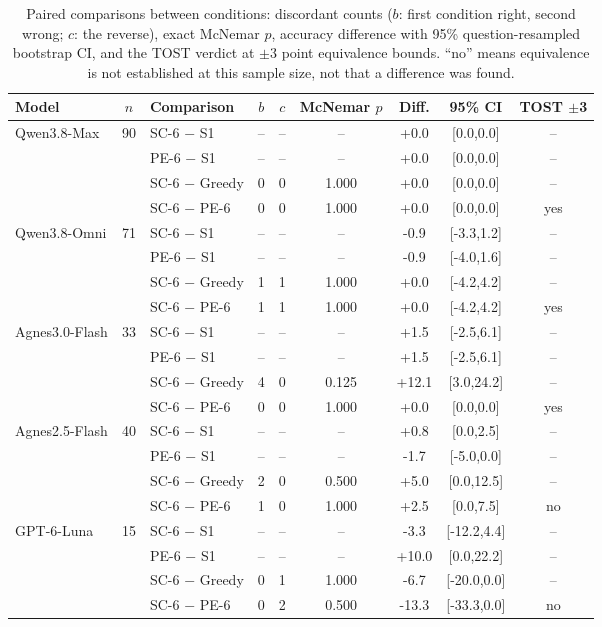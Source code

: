 \documentclass[preprint,12pt]{elsarticle}
\begin{document}
\begin{table}[htbp]
\centering
\footnotesize
\caption{Paired comparisons between conditions: discordant counts ($b$: first condition right, second wrong; $c$: the reverse), exact McNemar $p$, accuracy difference with 95\% question-resampled bootstrap CI, and the TOST verdict at $\pm 3$ point equivalence bounds. ``no'' means equivalence is not established at this sample size, not that a difference was found.}

\scriptsize
\begin{tabular}{l c l c c c c c c}
\toprule
Model & $n$ & Comparison & $b$ & $c$ & McNemar $p$ & Diff. & 95\% CI & TOST $\pm$3 \\
\midrule
Qwen3.8-Max & 90 & SC-6 $-$ S1 & -- & -- & -- & +0.0 & [0.0,0.0] & -- \\
 &  & PE-6 $-$ S1 & -- & -- & -- & +0.0 & [0.0,0.0] & -- \\
 &  & SC-6 $-$ Greedy & 0 & 0 & 1.000 & +0.0 & [0.0,0.0] & -- \\
 &  & SC-6 $-$ PE-6 & 0 & 0 & 1.000 & +0.0 & [0.0,0.0] & yes \\

Qwen3.8-Omni & 71 & SC-6 $-$ S1 & -- & -- & -- & -0.9 & [-3.3,1.2] & -- \\
 &  & PE-6 $-$ S1 & -- & -- & -- & -0.9 & [-4.0,1.6] & -- \\
 &  & SC-6 $-$ Greedy & 1 & 1 & 1.000 & +0.0 & [-4.2,4.2] & -- \\
 &  & SC-6 $-$ PE-6 & 1 & 1 & 1.000 & +0.0 & [-4.2,4.2] & yes \\

Agnes3.0-Flash & 33 & SC-6 $-$ S1 & -- & -- & -- & +1.5 & [-2.5,6.1] & -- \\
 &  & PE-6 $-$ S1 & -- & -- & -- & +1.5 & [-2.5,6.1] & -- \\
 &  & SC-6 $-$ Greedy & 4 & 0 & 0.125 & +12.1 & [3.0,24.2] & -- \\
 &  & SC-6 $-$ PE-6 & 0 & 0 & 1.000 & +0.0 & [0.0,0.0] & yes \\

Agnes2.5-Flash & 40 & SC-6 $-$ S1 & -- & -- & -- & +0.8 & [0.0,2.5] & -- \\
 &  & PE-6 $-$ S1 & -- & -- & -- & -1.7 & [-5.0,0.0] & -- \\
 &  & SC-6 $-$ Greedy & 2 & 0 & 0.500 & +5.0 & [0.0,12.5] & -- \\
 &  & SC-6 $-$ PE-6 & 1 & 0 & 1.000 & +2.5 & [0.0,7.5] & no \\

GPT-6-Luna & 15 & SC-6 $-$ S1 & -- & -- & -- & -3.3 & [-12.2,4.4] & -- \\
 &  & PE-6 $-$ S1 & -- & -- & -- & +10.0 & [0.0,22.2] & -- \\
 &  & SC-6 $-$ Greedy & 0 & 1 & 1.000 & -6.7 & [-20.0,0.0] & -- \\
 &  & SC-6 $-$ PE-6 & 0 & 2 & 0.500 & -13.3 & [-33.3,0.0] & no \\


\end{tabular}
\end{table}
\end{document}

